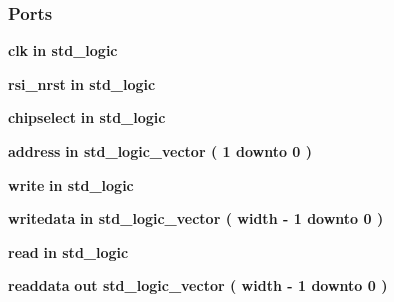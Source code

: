 \subsubsection*{Ports}
 \begin{DoxyCompactItemize}
\item 
{\bf clk}  {\bfseries {\bfseries \textcolor{keywordflow}{in}\textcolor{vhdlchar}{ }}} {\bfseries \textcolor{comment}{std\+\_\+logic}\textcolor{vhdlchar}{ }} 
\item 
{\bf rsi\+\_\+nrst}  {\bfseries {\bfseries \textcolor{keywordflow}{in}\textcolor{vhdlchar}{ }}} {\bfseries \textcolor{comment}{std\+\_\+logic}\textcolor{vhdlchar}{ }} 
\item 
{\bf chipselect}  {\bfseries {\bfseries \textcolor{keywordflow}{in}\textcolor{vhdlchar}{ }}} {\bfseries \textcolor{comment}{std\+\_\+logic}\textcolor{vhdlchar}{ }} 
\item 
{\bf address}  {\bfseries {\bfseries \textcolor{keywordflow}{in}\textcolor{vhdlchar}{ }}} {\bfseries \textcolor{comment}{std\+\_\+logic\+\_\+vector}\textcolor{vhdlchar}{ }\textcolor{vhdlchar}{(}\textcolor{vhdlchar}{ }\textcolor{vhdlchar}{ } \textcolor{vhdldigit}{1} \textcolor{vhdlchar}{ }\textcolor{keywordflow}{downto}\textcolor{vhdlchar}{ }\textcolor{vhdlchar}{ } \textcolor{vhdldigit}{0} \textcolor{vhdlchar}{ }\textcolor{vhdlchar}{)}\textcolor{vhdlchar}{ }} 
\item 
{\bf write}  {\bfseries {\bfseries \textcolor{keywordflow}{in}\textcolor{vhdlchar}{ }}} {\bfseries \textcolor{comment}{std\+\_\+logic}\textcolor{vhdlchar}{ }} 
\item 
{\bf writedata}  {\bfseries {\bfseries \textcolor{keywordflow}{in}\textcolor{vhdlchar}{ }}} {\bfseries \textcolor{comment}{std\+\_\+logic\+\_\+vector}\textcolor{vhdlchar}{ }\textcolor{vhdlchar}{(}\textcolor{vhdlchar}{ }\textcolor{vhdlchar}{ }\textcolor{vhdlchar}{ }\textcolor{vhdlchar}{ }{\bfseries {\bf width}} \textcolor{vhdlchar}{-\/}\textcolor{vhdlchar}{ } \textcolor{vhdldigit}{1} \textcolor{vhdlchar}{ }\textcolor{keywordflow}{downto}\textcolor{vhdlchar}{ }\textcolor{vhdlchar}{ } \textcolor{vhdldigit}{0} \textcolor{vhdlchar}{ }\textcolor{vhdlchar}{)}\textcolor{vhdlchar}{ }} 
\item 
{\bf read}  {\bfseries {\bfseries \textcolor{keywordflow}{in}\textcolor{vhdlchar}{ }}} {\bfseries \textcolor{comment}{std\+\_\+logic}\textcolor{vhdlchar}{ }} 
\item 
{\bf readdata}  {\bfseries {\bfseries \textcolor{keywordflow}{out}\textcolor{vhdlchar}{ }}} {\bfseries \textcolor{comment}{std\+\_\+logic\+\_\+vector}\textcolor{vhdlchar}{ }\textcolor{vhdlchar}{(}\textcolor{vhdlchar}{ }\textcolor{vhdlchar}{ }\textcolor{vhdlchar}{ }\textcolor{vhdlchar}{ }{\bfseries {\bf width}} \textcolor{vhdlchar}{-\/}\textcolor{vhdlchar}{ } \textcolor{vhdldigit}{1} \textcolor{vhdlchar}{ }\textcolor{keywordflow}{downto}\textcolor{vhdlchar}{ }\textcolor{vhdlchar}{ } \textcolor{vhdldigit}{0} \textcolor{vhdlchar}{ }\textcolor{vhdlchar}{)}\textcolor{vhdlchar}{ }} 

\end{DoxyCompactItemize}
